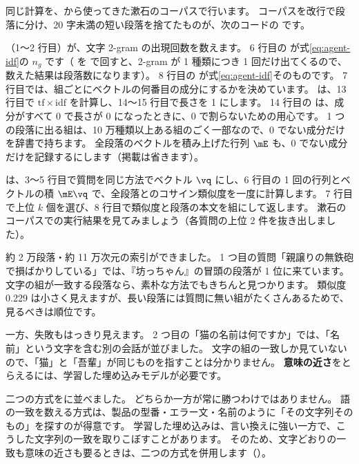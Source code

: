 同じ計算を、から使ってきた漱石のコーパスで行います。
コーパスを改行で段落に分け、20 字未満の短い段落を捨てたものが、次のコードの  です。


（1〜2 行目）が、文字 2-gram の出現回数を数えます。
6 行目の  が式\eqref{eq:agent-idf}の $n_g$ です（ を  で回すと、2-gram が 1 種類につき 1 回だけ出てくるので、数えた結果は段落数になります）。
8 行目の  が式\eqref{eq:agent-idf}そのものです。
7 行目では、組ごとにベクトルの何番目の成分にするかを決めています。
 は、13 行目で $\mathrm{tf}\times\mathrm{idf}$ を計算し、14〜15 行目で長さを 1 にします。
14 行目の  は、成分がすべて 0 で長さが 0 になったときに、0 で割らないための用心です。
1 つの段落に出る組は、10 万種類以上ある組のごく一部なので、0 でない成分だけを辞書で持ちます。
全段落のベクトルを積み上げた行列 $\mE$ も、0 でない成分だけを記録するにします（掲載は省きます）。


 は、3〜5 行目で質問を同じ方法でベクトル $\vq$ にし、6 行目の 1 回の行列とベクトルの積 $\mE\vq$ で、全段落とのコサイン類似度を一度に計算します。
7 行目で上位 $k$ 個を選び、8 行目で類似度と段落の本文を組にして返します。
漱石のコーパスでの実行結果を見てみましょう（各質問の上位 2 件を抜き出しました）。


約 2 万段落・約 11 万次元の索引ができました。
1 つ目の質問「親譲りの無鉄砲で損ばかりしている」では、『坊っちゃん』の冒頭の段落が 1 位に来ています。
文字の組が一致する段落なら、素朴な方法でもきちんと見つかります。
類似度 0.229 は小さく見えますが、長い段落には質問に無い組がたくさんあるためで、見るべきは順位です。

一方、失敗もはっきり見えます。
2 つ目の「猫の名前は何ですか」では、「名前」という文字を含む別の会話が並びました。
文字の組の一致しか見ていないので、「猫」と「吾輩」が同じものを指すことは分かりません。
\textbf{意味の近さ}をとらえるには、学習した埋め込みモデルが必要です。

二つの方式をに並べました。
どちらか一方が常に勝つわけではありません。
語の一致を数える方式は、製品の型番・エラー文・名前のように「その文字列そのもの」を探すのが得意です。
学習した埋め込みは、言い換えに強い一方で、こうした文字列の一致を取りこぼすことがあります。
そのため、文字どおりの一致も意味の近さも要るときは、二つの方式を併用します（）。

